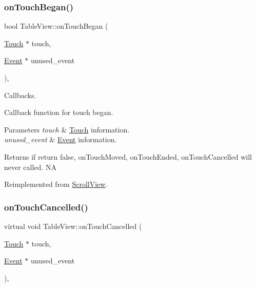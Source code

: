\subsubsection{\texorpdfstring{on\+Touch\+Began()}{onTouchBegan()}\hspace{0.1cm}{\footnotesize\ttfamily [2/2]}}
{\footnotesize\ttfamily bool Table\+View\+::on\+Touch\+Began (\begin{DoxyParamCaption}\item[{\hyperlink{classTouch}{Touch} $\ast$}]{touch,  }\item[{\hyperlink{classEvent}{Event} $\ast$}]{unused\+\_\+event }\end{DoxyParamCaption})\hspace{0.3cm}{\ttfamily [override]}, {\ttfamily [virtual]}}



Callbacks. 

Callback function for touch began.


\begin{DoxyParams}{Parameters}
{\em touch} & \hyperlink{classTouch}{Touch} information. \\
\hline
{\em unused\+\_\+event} & \hyperlink{classEvent}{Event} information. \\
\hline
\end{DoxyParams}
\begin{DoxyReturn}{Returns}
if return false, on\+Touch\+Moved, on\+Touch\+Ended, on\+Touch\+Cancelled will never called.  NA 
\end{DoxyReturn}


Reimplemented from \hyperlink{classScrollView_a18daa7ba9b5f802e65a6df2dde10a625}{Scroll\+View}.

\mbox{\label{classTableView_a743113e92ef98837c4cfdacf40fd0a0f}} 
\subsubsection{\texorpdfstring{on\+Touch\+Cancelled()}{onTouchCancelled()}\hspace{0.1cm}{\footnotesize\ttfamily [1/2]}}
{\footnotesize\ttfamily virtual void Table\+View\+::on\+Touch\+Cancelled (\begin{DoxyParamCaption}\item[{\hyperlink{classTouch}{Touch} $\ast$}]{touch,  }\item[{\hyperlink{classEvent}{Event} $\ast$}]{unused\+\_\+event }\end{DoxyParamCaption})\hspace{0.3cm}{\ttfamily [override]}, {\ttfamily [virtual]}}


